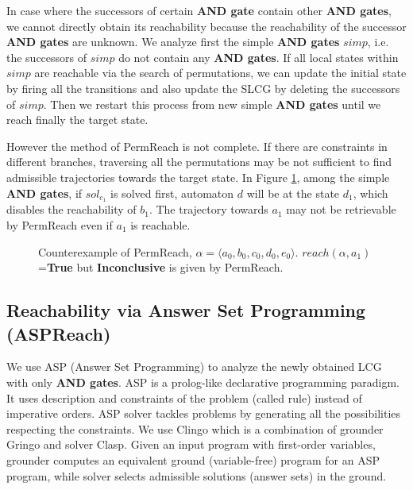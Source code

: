 In case where the successors of certain \textbf{AND gate} contain other \textbf{AND gates}, we cannot directly obtain its reachability because the reachability of the successor \textbf{AND gates} are unknown.
We analyze first the simple \textbf{AND gates} $simp$, i.e. the successors of $simp$ do not contain any \textbf{AND gates}.
If all local states within $simp$ are reachable via the search of permutations, we can update the initial state by firing all the transitions and also update the SLCG by deleting the successors of $simp$. 
Then we restart this process from new simple \textbf{AND gates} until we reach finally the target state.

However the method of PermReach is not complete. 
If there are constraints in different branches, traversing all the permutations may be not sufficient to find admissible trajectories towards the target state.
In Figure \ref{FigConflictInForks}, among the simple \textbf{AND gates}, if $sol_{c_1}$ is solved first, automaton $d$ will be at the state $d_1$, which disables the reachability of $b_1$.
The trajectory towards $a_1$ may not be retrievable by PermReach even if $a_1$ is reachable.
\begin{figure}[ht]
\centering

\caption[Counterexample of PermReach]{Counterexample of PermReach, $\alpha=\langle a_0,b_0,c_0,d_0,e_0\rangle$. 
$reach(\alpha,a_1)$=\textbf{True} but \textbf{Inconclusive} is given by PermReach.
}\label{FigConflictInForks}
\end{figure}
\subsection{Reachability via Answer Set Programming (ASPReach)}
We use ASP  (Answer Set Programming) \cite{baral2003knowledge} to analyze the newly obtained LCG with only \textbf{AND gates}.
ASP is a prolog-like declarative programming paradigm.
It uses description and constraints of the problem (called rule) instead of imperative orders.
ASP solver tackles problems by generating all the possibilities respecting the constraints. 
We use Clingo \cite{gebser2016theory} which is a combination of grounder Gringo and solver Clasp. 
Given an input program with first-order variables, grounder computes an equivalent ground (variable-free) program for an ASP program, while solver selects admissible solutions (answer sets) in the ground.

